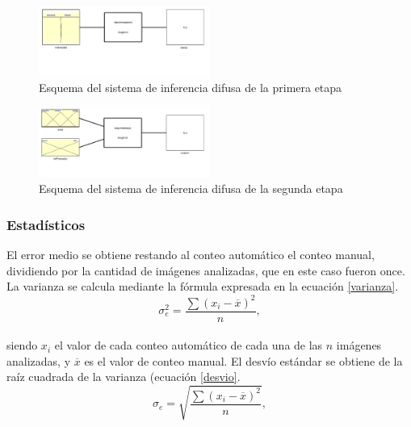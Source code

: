 \begin{figure}[h!]
    \centering
    \includegraphics[width=0.5\textwidth]{Imagenes/Homomorfico/sugeno1.png}
     \hfill
     \caption{Esquema del sistema de inferencia difusa de la primera etapa}
    \label{sug1}
\end{figure}
\begin{figure}[h!]
    \centering
    \includegraphics[width=0.5\textwidth]{Imagenes/Homomorfico/sugeno2.png}
     \hfill
     \caption{Esquema del sistema de inferencia difusa de la segunda etapa}
    \label{sug2}
\end{figure}

\subsubsection{Estadísticos} 
El error medio se obtiene restando al conteo automático el conteo manual, dividiendo por la cantidad de imágenes analizadas, que en este caso fueron once.
La varianza se calcula mediante la fórmula expresada en la ecuación \ref{varianza}.
\\
\begin{equation}
	\sigma_{e} ^2=\frac{\sum (x_{i}-\overline{x})^2}{n},\label{varianza}
\end{equation}
\\
siendo $x_i$ el valor de cada conteo automático de cada una de las $n$ imágenes analizadas, y $\overline{x}$ es el valor de conteo manual.
El desvío estándar se obtiene de la raíz cuadrada de la varianza (ecuación \ref{desvio}.
\\
\begin{equation}
	\sigma_{e}=\sqrt{\frac{\sum (x_{i}-\overline{x})^2}{n}},\label{desvio}
\end{equation}
\\
